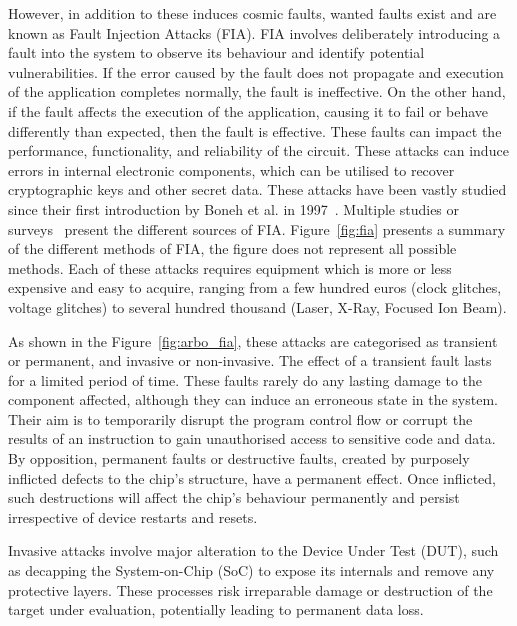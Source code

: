 However, in addition to these induces cosmic faults, wanted faults exist and are known as Fault Injection Attacks (FIA). FIA involves deliberately introducing a fault into the system to observe its behaviour and identify potential vulnerabilities. If the error caused by the fault does not propagate and execution of the application completes normally, the fault is ineffective. On the other hand, if the fault affects the execution of the application, causing it to fail or behave differently than expected, then the fault is effective. These faults can impact the performance, functionality, and reliability of the circuit. These attacks can induce errors in internal electronic components, which can be utilised to recover cryptographic keys and other secret data.
These attacks have been vastly studied since their first introduction by Boneh et al. in 1997~\cite{BDL-97-eurocrypt,BDL-01-crypto}. Multiple studies or surveys~\cite{ZAV-06-jarab, BCNTW-06-procieee, CKNDCTD-21-compsec, PBR-15-dtis, YSW-18-hss, BH-22-access} present the different sources of FIA.
Figure~\ref{fig:fia} presents a summary of the different methods of FIA, the figure does not represent all possible methods. Each of these attacks requires equipment which is more or less expensive and easy to acquire, ranging from a few hundred euros (clock glitches, voltage glitches) to several hundred thousand (Laser, X-Ray, Focused Ion Beam).

As shown in the Figure~\ref{fig:arbo_fia}, these attacks are categorised as transient or permanent, and invasive or non-invasive.
The effect of a transient fault lasts for a limited period of time. These faults rarely do any lasting damage to the component affected, although they can induce an erroneous state in the system. Their aim is to temporarily disrupt the program control flow or corrupt the results of an instruction to gain unauthorised access to sensitive code and data.
By opposition, permanent faults or destructive faults, created by purposely inflicted defects to the chip’s structure, have a permanent effect. Once inflicted, such destructions will affect the chip’s behaviour permanently and persist irrespective of device restarts and resets.

Invasive attacks involve major alteration to the Device Under Test (DUT), such as decapping the System-on-Chip (SoC) to expose its internals and remove any protective layers. These processes risk irreparable damage or destruction of the target under evaluation, potentially leading to permanent data loss.

